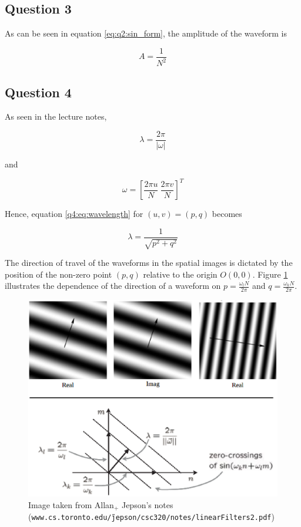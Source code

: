 	\subsection{Question 3}

		As can be seen in equation \ref{eq:q2:sin_form}, the amplitude of the waveform is
	
		\begin{equation}
			A = \dfrac{1}{N^2}
		\end{equation}
	
	\subsection{Question 4}
	
		As seen in the lecture notes, 
		
		\begin{equation}
			\lambda = \frac{2 \pi}{|\omega|}
			\label{q4:eq:wavelength}
		\end{equation}
		
		and 
		
		\begin{equation}
			\omega = [\frac{2 \pi u}{N} \ \frac{2 \pi v}{N}]^T
		\end{equation}
		
		Hence, equation \ref{q4:eq:wavelength} for $(u,v)=(p,q)$ becomes
		
		\begin{equation}
			\lambda = \frac{1}{\sqrt{p^2+q^2}}
		\end{equation}
		
		The direction of travel of the waveforms in the spatial images is dictated by the position of the non-zero point $(p,q)$ relative to the origin $O(0,0)$.
		Figure \ref{fig:Q4} illustrates the dependence of the direction of a waveform on $p = \frac{\omega_l N}{2 \pi}$ and $q = \frac{\omega_k N}{2 \pi}$.
		
		\begin{figure}
			\centering
			\includegraphics[scale=0.4]{./images/Q4/wavelength.eps}
			\caption{Image taken from Allan$_+$ Jepson's notes (\texttt{www.cs.toronto.edu/\~jepson/csc320/notes/linearFilters2.pdf})}
			\label{fig:Q4}		
		\end{figure}
		
